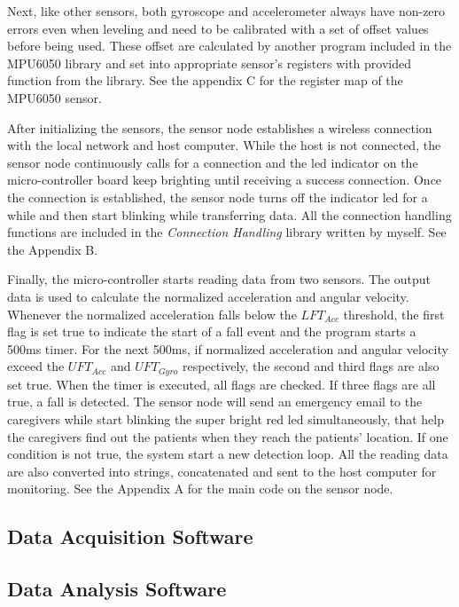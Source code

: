 \documentclass[letterpaper,12pt,titlepage,oneside,final]{book}
\begin{document}
Next, like other sensors, both gyroscope and accelerometer always have non-zero errors even when leveling and need to be calibrated with a set of offset values before being used. These offset are calculated by another program included in the MPU6050 library and set into appropriate sensor's registers with provided function from the library. See the appendix C for the register map of the MPU6050 sensor. \par
After initializing the sensors, the sensor node establishes a wireless connection with the local network and host computer. While the host is not connected, the sensor node continuously calls for a connection and the led indicator on the micro-controller board keep brighting until receiving a success connection. Once the connection is established, the sensor node turns off the indicator led for a while and then start blinking while transferring data. All the connection handling functions are included in the \textit{Connection Handling} library written by myself. See the Appendix B.\par 

Finally, the micro-controller starts reading data from two sensors. The output data is used to calculate the normalized acceleration and angular velocity. Whenever the normalized acceleration falls below the $LFT_{Acc}$ threshold, the first flag is set true to indicate the start of a fall event and the program starts a 500ms timer. For the next 500ms, if normalized acceleration and angular velocity exceed the $UFT_{Acc}$ and $UFT_{Gyro}$ respectively, the second and third flags are also set true. When the timer is executed, all flags are checked. If three flags are all true, a fall is detected. The sensor node will send an emergency email to the caregivers while start blinking the super bright red led simultaneously, that help the caregivers find out the patients when they reach the patients' location. If one condition is not true, the system start a new detection loop. All the reading data are also converted into strings, concatenated and sent to the host computer for monitoring. See the Appendix A for the main code on the sensor node. 
\subsection{Data Acquisition Software}

\subsection{Data Analysis Software}
\end{document}
